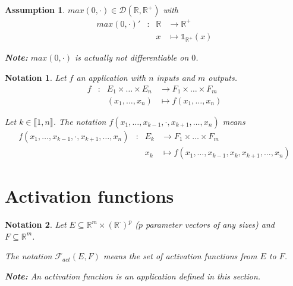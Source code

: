 \documentclass[11pt,en]{elegantpaper}
\newtheorem{notation}{Notation}
\newtheorem{assumption}{Assumption}
\newcommand{\Real}{\mathbb{R}}
\begin{document}
\begin{assumption}\label{assump:max_differentiable}
  $max(0,\cdot) \in \mathcal{D}(\Real, \Real^+)$ with
  \begin{equation*}
    \begin{array}{lllll}
      max(0,\cdot)' & : & \Real & \longrightarrow \Real^+ \\
      &   & x & \longmapsto \mathbb{1}_{\Real^+}(x)
    \end{array}
  \end{equation*}\par

  \textbf{Note:} $max(0,\cdot)$ is actually not differentiable on $0$. \par
\end{assumption}

\begin{notation}
  Let $f$ an application with $n$ inputs and $m$ outputs.
  \begin{equation*}
    \begin{array}{llll}
      f & : & E_1 \times \ldots \times E_n & \longrightarrow F_1 \times \ldots \times F_m \\
      &   & (x_1, \ldots, x_n) & \longmapsto f(x_1, \ldots, x_n)
    \end{array}
  \end{equation*} \par

  Let $k \in \llbracket 1,n \rrbracket$. The notation $f(x_1, \ldots, x_{k-1}, \cdot, x_{k+1}, \ldots, x_n)$ means \begin{equation*}
    \begin{array}{llll}
      f(x_1, \ldots, x_{k-1}, \cdot, x_{k+1}, \ldots, x_n) & : & E_k & \longrightarrow F_1 \times \ldots \times F_m \\
      &   & x_k & \longmapsto f(x_1, \ldots, x_{k-1}, x_k, x_{k+1}, \ldots, x_n)
    \end{array}
  \end{equation*}
\end{notation}

\section{Activation functions}

\begin{notation}
  Let $E \subseteq \Real^m \times (\Real^{\cdot})^p$ ($p$ parameter vectors of any sizes) and $F \subseteq \Real^m$. \par
  The notation $\mathcal{F}_{act}(E,F)$ means the set of activation functions from $E$ to $F$. \par
  \textbf{Note:} An activation function is an application defined in this section. \par
\end{notation}
\end{document}
